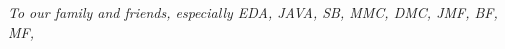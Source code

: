 



\begin{center}
	\textit{To our family and friends, especially EDA, JAVA, SB, MMC, DMC, JMF, BF, MF, }
\end{center}








